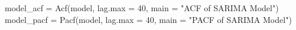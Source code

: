 \documentclass[
]{article}
\newenvironment{Shaded}{\begin{snugshade}}{\end{snugshade}}
\newcommand{\AttributeTok}[1]{\textcolor[rgb]{0.77,0.63,0.00}{#1}}
\newcommand{\DecValTok}[1]{\textcolor[rgb]{0.00,0.00,0.81}{#1}}
\newcommand{\FunctionTok}[1]{\textcolor[rgb]{0.00,0.00,0.00}{#1}}
\newcommand{\NormalTok}[1]{#1}
\newcommand{\OtherTok}[1]{\textcolor[rgb]{0.56,0.35,0.01}{#1}}
\newcommand{\StringTok}[1]{\textcolor[rgb]{0.31,0.60,0.02}{#1}}
\begin{document}
\begin{Shaded}
\begin{Highlighting}[]
\NormalTok{model\_acf }\OtherTok{=} \FunctionTok{Acf}\NormalTok{(model, }\AttributeTok{lag.max =} \DecValTok{40}\NormalTok{, }\AttributeTok{main =} \StringTok{"ACF of SARIMA Model"}\NormalTok{)}
\NormalTok{model\_pacf }\OtherTok{=} \FunctionTok{Pacf}\NormalTok{(model, }\AttributeTok{lag.max =} \DecValTok{40}\NormalTok{, }\AttributeTok{main =} \StringTok{"PACF of SARIMA Model"}\NormalTok{)}
\end{Highlighting}
\end{Shaded}
\end{document}
